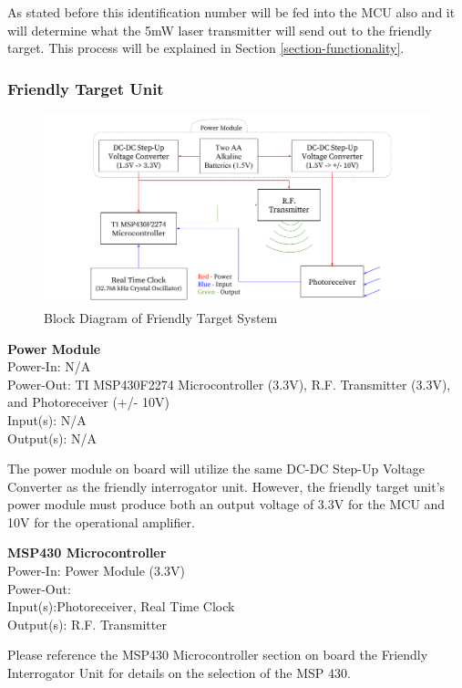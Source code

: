 \documentclass[letterpaper,10pt]{article}
\begin{document}
\begin{spacing}{1.15}
As stated before this identification number will be fed into the MCU also and it will determine what the 5mW laser transmitter will send out to the friendly target. This process will be explained in Section \ref{section-functionality}.

\subsubsection{Friendly Target Unit}

\begin{figure} [H]
	\centering
	\includegraphics[scale=0.50]{Friendly_Target_Block_Diagram.png}
	\caption{Block Diagram of Friendly Target System\label{fig:friendly-target-block}}
\end{figure}

\normalsize\textbf{Power Module} \\
Power-In: N/A\\
Power-Out: TI MSP430F2274 Microcontroller (3.3V), R.F. Transmitter (3.3V), and Photoreceiver (+/- 10V)\\
Input(s): N/A\\
Output(s): N/A

The power module on board will utilize the same DC-DC Step-Up Voltage Converter as the friendly interrogator unit. However, the friendly target unit's power module must produce both an output voltage of 3.3V for the MCU and 10V for the operational amplifier. 

\normalsize\textbf{MSP430 Microcontroller} \\
Power-In: Power Module (3.3V)\\
Power-Out:\\
Input(s):Photoreceiver, Real Time Clock\\
Output(s): R.F. Transmitter 

Please reference the MSP430 Microcontroller section on board the Friendly Interrogator Unit for details on the selection of the MSP 430. 


\end{spacing}
\end{document}
